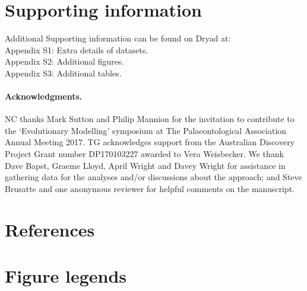 \documentclass[12pt,a4paper]{article}
\begin{document}
\section{Supporting information}
Additional Supporting information can be found on Dryad at:\\
Appendix S1: Extra details of datasets. \\
Appendix S2: Additional figures. \\
Appendix S3: Additional tables.

\paragraph{Acknowledgments.}
  NC thanks Mark Sutton and Philip Mannion for the invitation to contribute to the `Evolutionary Modelling' symposium at The Palaeontological Association Annual Meeting 2017.
  TG acknowledges support from the Australian Discovery Project Grant number DP170103227 awarded to Vera Weisbecker.
  We thank Dave Bapst, Graeme Lloyd, April Wright and Davey Wright for assistance in gathering data for the analyses and/or discussions about the approach; and Steve Brusatte and one anonymous reviewer for helpful comments on the manuscript.

\section{References}

 
 

\newpage
\section{Figure legends}

% 

%  
\end{document}
